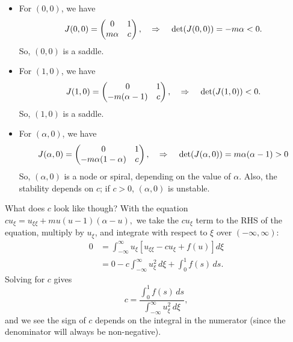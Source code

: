 \documentclass[]{article}
\numberwithin{equation}{section}		%
\begin{document}
\begin{itemize}
\item  For $(0,0)$, we have 
\begin{equation*}
J(0,0)=
\begin{pmatrix}
  0 & 1 \\
  m\alpha & c \\
\end{pmatrix}, \hspace{.15in}\Rightarrow \hspace{.15in} \det(J(0,0))=-m\alpha < 0. \end{equation*} So, $(0,0)$ is a saddle.

\item  For $(1,0)$, we have 
\begin{equation*}
J(1,0)=
\begin{pmatrix}
   0 & 1 \\
  -m(\alpha-1) & c \\
\end{pmatrix}, \hspace{.15in}\Rightarrow \hspace{.15in} \det(J(1,0))< 0. \end{equation*} So, $(1,0)$ is a saddle.

\item  For $(\alpha,0)$, we have 
\begin{equation*}
J(\alpha,0)=
\begin{pmatrix}
   0 & 1 \\
  -m\alpha(1-\alpha) & c \\
\end{pmatrix}, \hspace{.15in}\Rightarrow \hspace{.15in} \det(J(\alpha,0))=m\alpha(\alpha-1) > 0 \end{equation*} So, $(\alpha,0)$ is a node or spiral, depending on the value of $\alpha$. Also, the stability depends on $c$; if $c>0$, $(\alpha, 0)$ is unstable.
\end{itemize}

What does $c$ look like though? With the equation $cu_\xi  = u_{\xi\xi} + mu(u-1)(\alpha - u),$ we take the $cu_\xi$ term to the RHS of the equation, multiply by $u_\xi$, and integrate with respect to $\xi$ over $(-\infty, \infty)$: 
\begin{align*}
0 &= \int_{-\infty}^{\infty} u_\xi\left[u_{\xi\xi}-cu_\xi+f(u)\right] d\xi \\
&= 0 -c\int_{-\infty}^{\infty} u_\xi^2\,d\xi + \int_{0}^{1}f(s)\,ds.
\end{align*}
Solving for $c$ gives
\begin{equation*}
c = \frac{\int_{0}^{1}f(s)\,ds}{\int_{-\infty}^{\infty} u_\xi^2\,d\xi},
\end{equation*} and we see the sign of $c$ depends on the integral in the numerator (since the denominator will always be non-negative).
\end{document}
